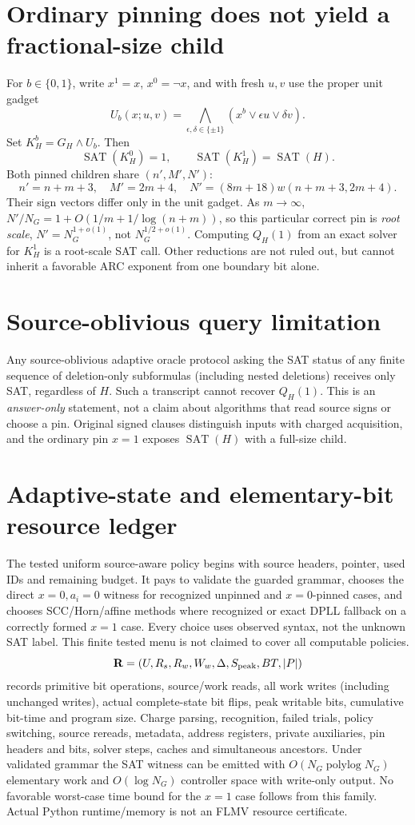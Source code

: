 \documentclass[11pt]{article}
\begin{document}
\section{Ordinary pinning does not yield a fractional-size child}
For $b\in\{0,1\}$, write $x^1=x$, $x^0=\neg x$, and with fresh $u,v$ use the proper unit gadget
\[
 U_b(x;u,v)=\bigwedge_{\epsilon,\delta\in\{\pm1\}}
 (x^b\vee\epsilon u\vee\delta v).
\]
Set $K_H^b=G_H\wedge U_b$. Then
\[
 \operatorname{SAT}(K_H^0)=1,\qquad
 \operatorname{SAT}(K_H^1)=\operatorname{SAT}(H).
\]
Both pinned children share $(n',M',N')$:
\[
 n'=n+m+3,\quad M'=2m+4,\quad
 N'=(8m+18)w(n+m+3,2m+4).\tag{4}
\]
Their sign vectors differ only in the unit gadget. As $m\to\infty$, $N'/N_G=1+O(1/m+1/\log(n+m))$, so this particular correct pin is \emph{root scale}, $N'=N_G^{1+o(1)}$, not $N_G^{1/2+o(1)}$. Computing $Q_H(1)$ from an exact solver for $K_H^1$ is a root-scale SAT call. Other reductions are not ruled out, but cannot inherit a favorable ARC exponent from one boundary bit alone.

\section{Source-oblivious query limitation}
Any source-oblivious adaptive oracle protocol asking the SAT status of any finite sequence of deletion-only subformulas (including nested deletions) receives only SAT, regardless of $H$. Such a transcript cannot recover $Q_H(1)$. This is an \emph{answer-only} statement, not a claim about algorithms that read source signs or choose a pin. Original signed clauses distinguish inputs with charged acquisition, and the ordinary pin $x=1$ exposes $\operatorname{SAT}(H)$ with a full-size child.

\section{Adaptive-state and elementary-bit resource ledger}
The tested uniform source-aware policy begins with source headers, pointer, used IDs and remaining budget. It pays to validate the guarded grammar, chooses the direct $x=0,a_i=0$ witness for recognized unpinned and $x=0$-pinned cases, and chooses SCC/Horn/affine methods where recognized or exact DPLL fallback on a correctly formed $x=1$ case. Every choice uses observed syntax, not the unknown SAT label. This finite tested menu is not claimed to cover all computable policies.
\[
\mathbf R=(U,R_s,R_w,W_w,\Delta,S_{\rm peak},BT,|P|)
\]
records primitive bit operations, source/work reads, all work writes (including unchanged writes), actual complete-state bit flips, peak writable bits, cumulative bit-time and program size. Charge parsing, recognition, failed trials, policy switching, source rereads, metadata, address registers, private auxiliaries, pin headers and bits, solver steps, caches and simultaneous ancestors. Under validated grammar the SAT witness can be emitted with $O(N_G\operatorname{polylog}N_G)$ elementary work and $O(\log N_G)$ controller space with write-only output. No favorable worst-case time bound for the $x=1$ case follows from this family. Actual Python runtime/memory is not an FLMV resource certificate.
\end{document}
